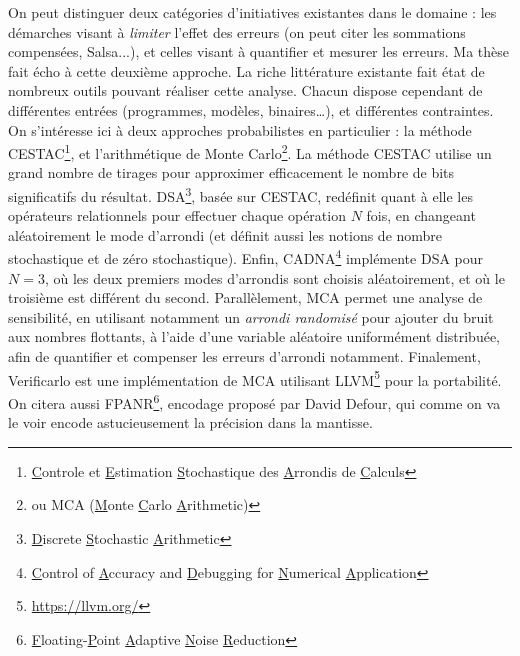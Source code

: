 \documentclass[a4paper,11pt]{article}
\begin{document}
On peut distinguer deux catégories d'initiatives existantes dans le domaine : les démarches visant à \textit{limiter} l’effet des erreurs (on peut citer les sommations compensées\cite{Demmel2006ErrorBF}, Salsa\cite{damouche2016amelioration}...), et celles visant à quantifier et mesurer les erreurs.
Ma thèse fait écho à cette deuxième approche.
La riche littérature existante fait état de nombreux outils pouvant réaliser cette analyse. Chacun dispose cependant de différentes entrées (programmes, modèles, binaires…), et différentes contraintes.
On s’intéresse ici à deux approches probabilistes en particulier : la méthode CESTAC\footnote{\underline{C}ontrole et \underline{E}stimation \underline{S}tochastique des \underline{A}rrondis de \underline{C}alculs}, et l’arithmétique de Monte Carlo\footnote{ou MCA (\underline{M}onte \underline{C}arlo \underline{A}rithmetic)}.
La méthode CESTAC\cite{pichat1993ingenierie} utilise un grand nombre de tirages pour approximer efficacement le nombre de bits significatifs du résultat.
DSA\footnote{\underline{D}iscrete \underline{S}tochastic \underline{A}rithmetic}\cite{vignes2004discrete}, basée sur CESTAC, redéfinit quant à elle les opérateurs relationnels pour effectuer chaque opération $N$ fois, en changeant aléatoirement le mode d’arrondi (et définit aussi les notions de nombre stochastique et de zéro stochastique).
Enfin, CADNA\footnote{\underline{C}ontrol of \underline{A}ccuracy and \underline{D}ebugging for \underline{N}umerical \underline{A}pplication}\cite{jezequel2008cadna} implémente DSA pour $N=3$, où les deux premiers modes d’arrondis sont choisis aléatoirement, et où le troisième est différent du second.
Parallèlement, MCA\cite{parker1997monte} permet une analyse de sensibilité, en utilisant notamment un \textit{arrondi randomisé} pour ajouter du bruit aux nombres flottants, à l'aide d'une variable aléatoire uniformément distribuée, afin de quantifier et compenser les erreurs d'arrondi notamment.
Finalement, Verificarlo\cite{denis2015verificarlo} est une implémentation de MCA utilisant LLVM\footnote{\url{https://llvm.org/}} pour la portabilité.
On citera aussi FPANR\footnote{\underline{F}loating-\underline{P}oint \underline{A}daptive \underline{N}oise \underline{R}eduction}\cite{defour2018fp}, encodage proposé par David Defour, qui comme on va le voir encode astucieusement la précision dans la mantisse.

\end{document}
